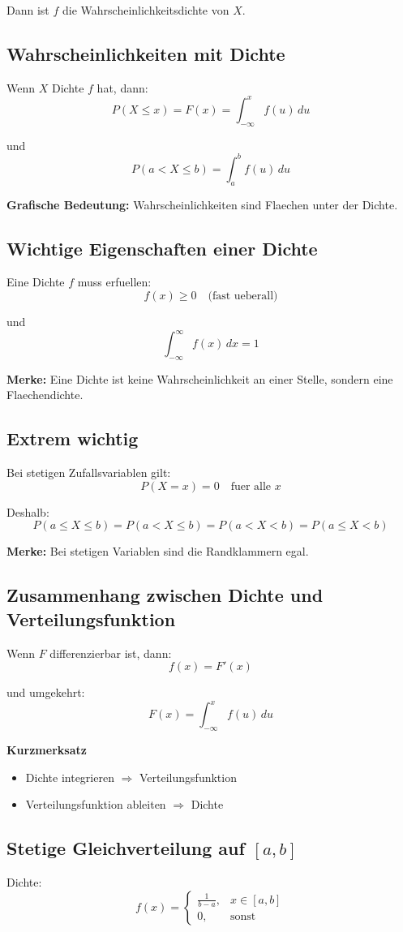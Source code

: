 \documentclass[a4paper,11pt]{article}
\begin{document}
Dann ist $f$ die Wahrscheinlichkeitsdichte von $X$.

\subsection{Wahrscheinlichkeiten mit Dichte}
Wenn $X$ Dichte $f$ hat, dann:
\[
P(X\le x)=F(x)=\int_{-\infty}^x f(u)\,du
\]

und
\[
P(a<X\le b)=\int_a^b f(u)\,du
\]

\textbf{Grafische Bedeutung:}
Wahrscheinlichkeiten sind Flaechen unter der Dichte.

\subsection{Wichtige Eigenschaften einer Dichte}
Eine Dichte $f$ muss erfuellen:
\[
f(x)\ge 0
\quad \text{(fast ueberall)}
\]

und
\[
\int_{-\infty}^{\infty} f(x)\,dx=1
\]

\textbf{Merke:}
Eine Dichte ist keine Wahrscheinlichkeit an einer Stelle, sondern eine Flaechendichte.

\subsection{Extrem wichtig}
Bei stetigen Zufallsvariablen gilt:
\[
P(X=x)=0
\quad \text{fuer alle } x
\]

Deshalb:
\[
P(a\le X\le b)=P(a<X\le b)=P(a<X<b)=P(a\le X<b)
\]

\textbf{Merke:}
Bei stetigen Variablen sind die Randklammern egal.

\subsection{Zusammenhang zwischen Dichte und Verteilungsfunktion}
Wenn $F$ differenzierbar ist, dann:
\[
f(x)=F'(x)
\]

und umgekehrt:
\[
F(x)=\int_{-\infty}^x f(u)\,du
\]

\textbf{Kurzmerksatz}
\begin{itemize}
  \item Dichte integrieren $\Rightarrow$ Verteilungsfunktion
  \item Verteilungsfunktion ableiten $\Rightarrow$ Dichte
\end{itemize}

\subsection{Stetige Gleichverteilung auf $[a,b]$}
Dichte:
\[
f(x)=
\begin{cases}
\frac{1}{b-a},& x\in [a,b] \\
0,& \text{sonst}
\end{cases}
\]
\end{document}
